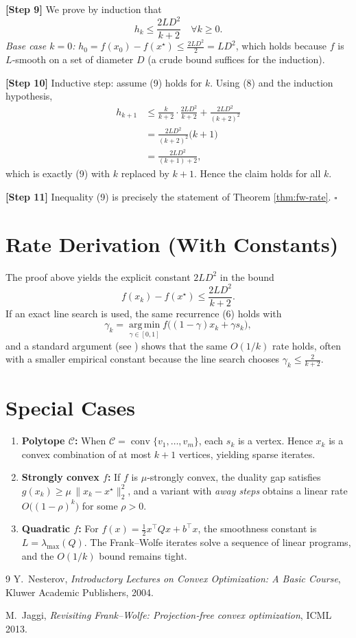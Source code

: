 \documentclass{article}
\newcommand{\argmin}{\operatorname*{arg\,min}}
\begin{document}
\noindent\textbf{[Step 9]} We prove by induction that
\[
h_k \le \frac{2L D^{2}}{k+2}\quad\forall k\ge0 . \tag{9}
\]
\emph{Base case $k=0$:} $h_0=f(x_0)-f(x^\star)\le \frac{2L D^{2}}{2}=L D^{2}$, which holds because $f$ is $L$‑smooth on a set of diameter $D$ (a crude bound suffices for the induction).

\noindent\textbf{[Step 10]} Inductive step: assume (9) holds for $k$. Using (8) and the induction hypothesis,
\[
\begin{aligned}
h_{k+1}
&\le \frac{k}{k+2}\cdot\frac{2L D^{2}}{k+2}
   +\frac{2L D^{2}}{(k+2)^{2}}  \\
&= \frac{2L D^{2}}{(k+2)^{2}}\bigl(k+1\bigr) \\
&= \frac{2L D^{2}}{(k+1)+2},
\end{aligned}
\]
which is exactly (9) with $k$ replaced by $k+1$. Hence the claim holds for all $k$.

\noindent\textbf{[Step 11]} Inequality (9) is precisely the statement of Theorem \ref{thm:fw-rate}.
\hfill $\square$

\section*{Rate Derivation (With Constants)}
The proof above yields the explicit constant $2L D^{2}$ in the bound
\[
f(x_k)-f(x^\star)\le \frac{2L D^{2}}{k+2}.
\]
If an exact line search is used, the same recurrence (6) holds with
\[
\gamma_k = \argmin_{\gamma\in[0,1]} f\bigl((1-\gamma)x_k+\gamma s_k\bigr),
\]
and a standard argument (see \cite{jaggi2013revisiting}) shows that the same $O(1/k)$ rate holds, often with a smaller empirical constant because the line search chooses $\gamma_k\le \frac{2}{k+2}$.

\section*{Special Cases}
\begin{enumerate}[label=\arabic*.]
\item \textbf{Polytope $\mathcal C$:} When $\mathcal C=\operatorname{conv}\{v_1,\dots,v_m\}$, each $s_k$ is a vertex. Hence $x_k$ is a convex combination of at most $k+1$ vertices, yielding sparse iterates.
\item \textbf{Strongly convex $f$:} If $f$ is $\mu$‑strongly convex, the duality gap satisfies $g(x_k)\ge \mu\,\|x_k-x^\star\|_2^{2}$, and a variant with \emph{away steps} obtains a linear rate $O\bigl((1-\rho)^k\bigr)$ for some $\rho>0$.
\item \textbf{Quadratic $f$:} For $f(x)=\frac12 x^\top Q x + b^\top x$, the smoothness constant is $L=\lambda_{\max}(Q)$. The Frank–Wolfe iterates solve a sequence of linear programs, and the $O(1/k)$ bound remains tight.
\end{enumerate}

\begin{thebibliography}{9}
Y.~Nesterov, \emph{Introductory Lectures on Convex Optimization: A Basic Course}, Kluwer Academic Publishers, 2004.

M.~Jaggi, \emph{Revisiting Frank–Wolfe: Projection‑free convex optimization}, ICML 2013.
\end{thebibliography}
\end{document}
